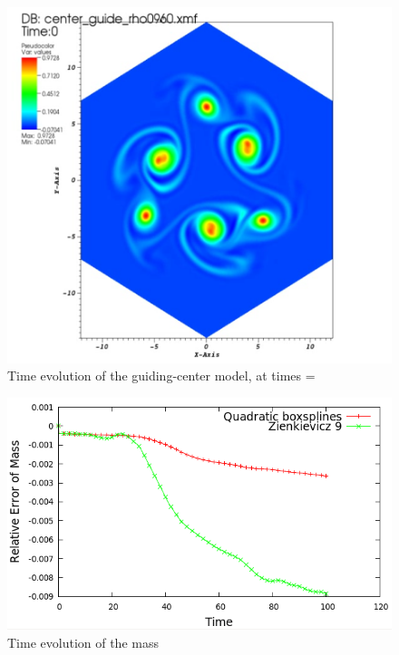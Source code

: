 \documentclass[proc]{edpsmath}
\begin{document}
\begin{figure}[h!]
	\includegraphics[scale=0.15]{figures/gc_spl_5.png}
	\caption{Time evolution of the guiding-center model, at times = }
\end{figure}

\begin{figure}[h!]
	\includegraphics[scale=0.4]{figures/Relative_error_of_mass_160.png}
	\caption{Time evolution of the mass}
\end{figure}
\end{document}
